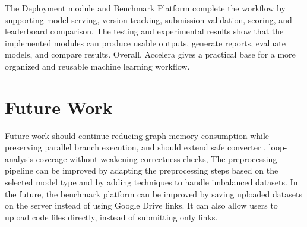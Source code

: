 \documentclass[12pt,a4paper]{report}
\begin{document}
\noindent The Deployment module and Benchmark Platform complete the workflow by
supporting model serving, version tracking, submission validation, scoring, and
leaderboard comparison. The testing and experimental results show that the
implemented modules can produce usable outputs, generate reports, evaluate
models, and compare results. Overall, Accelera gives a practical base for a
more organized and reusable machine learning workflow.

\section{Future Work}
Future work should continue reducing graph memory consumption while preserving
parallel branch execution, and should extend safe converter , loop-analysis
coverage without weakening correctness checks, The preprocessing pipeline can be improved by adapting the preprocessing steps based on the selected model type and by adding techniques to handle imbalanced datasets.
In the future, the benchmark platform can be improved by saving uploaded datasets on the server instead of using Google Drive links. It can also allow users to upload code files directly, instead of submitting only links.
\end{document}
